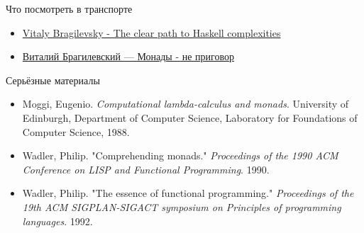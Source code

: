
    \begin{frame}[fragile]{Что посмотреть в транспорте}
        \begin{itemize}
            \item \href{https://youtu.be/n3H_YipBDrY?si=FDJRw5M4hD7a1SKh}{\color{blue}  Vitaly Bragilevsky - The clear path to Haskell complexities }
            \item \href{https://youtu.be/IkXg_mjNgG4?si=5EG8RHG3nH-kDuUa}{\color{blue} Виталий Брагилевский — Монады - не приговор}
        \end{itemize}
    \end{frame}

    \begin{frame}[fragile]{Серьёзные материалы}
        \begin{itemize}
            \item Moggi, Eugenio. \textit{Computational lambda-calculus and monads}. University of Edinburgh, Department of Computer Science, Laboratory for Foundations of Computer Science, 1988.
            \item Wadler, Philip. "Comprehending monads." \textit{Proceedings of the 1990 ACM Conference on LISP and Functional Programming}. 1990.
            \item Wadler, Philip. "The essence of functional programming." \textit{Proceedings of the 19th ACM SIGPLAN-SIGACT symposium on Principles of programming languages}. 1992.
        \end{itemize}
    \end{frame}



